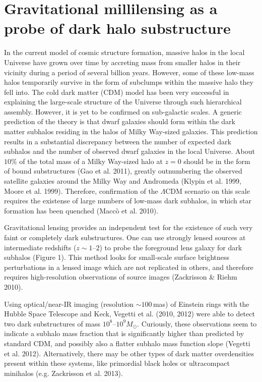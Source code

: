 \documentclass[a4paper, 11pt]{article}
\begin{document}
\section{Gravitational millilensing as a probe of dark halo substructure}
In the current model of cosmic structure formation, massive halos in the local Universe have grown over time by accreting mass from smaller halos in their vicinity during a period of several billion years. However, some of these low-mass halos temporarily survive in the form of subclumps within the massive halo they fell into. The cold dark matter (CDM) model has been very successful in explaining the large-scale structure of the Universe through such hierarchical assembly. However, it is yet to be confirmed on sub-galactic scales. A generic prediction of the theory is that dwarf galaxies should form within the dark matter subhalos residing in the halos of Milky Way-sized galaxies. This prediction results in a substantial discrepancy between the number of expected dark subhalos and the number of observed dwarf galaxies in the local Universe. About $10\%$ of the total mass of a Milky Way-sized halo at $z = 0$ should be in the form of bound substructures (Gao et al. 2011), greatly outnumbering the observed satellite galaxies around the Milky Way and Andromeda (Klypin et al. 1999, Moore et al. 1999). Therefore, confirmation of the $\Lambda$CDM scenario on this scale requires the existense of large numbers of low-mass dark subhalos, in which star formation has been quenched (Macc\`o et al. 2010). 

Gravitational lensing provides an independent test for the existence of such very faint or completely dark substructures. One can use strongly lensed sources at intermediate redshifts ($z \sim 1$--$2$) to probe the foreground lens galaxy for dark subhalos (Figure 1). This method looks for small-scale surface brightness perturbations in a lensed image which are not replicated in others, and therefore requires high-resolution observations of source images (Zackrisson \& Riehm 2010).

Using optical/near-IR imaging (resolution $\sim 100$\,mas) of Einstein rings with the Hubble Space Telescope and Keck, Vegetti et al. (2010, 2012) were able to detect two dark substructures of mass $10^8$--$10^9 M_\odot$. Curiously, these observations seem to indicate a subhalo mass fraction that is significantly higher than predicted by standard CDM, and possibly also a flatter subhalo mass function slope (Vegetti et al. 2012). Alternatively, there may be other types of dark matter overdensities present within these systems, like primordial black holes or ultracompact minihalos (e.g. Zackrisson et al. 2013). 
\end{document}
